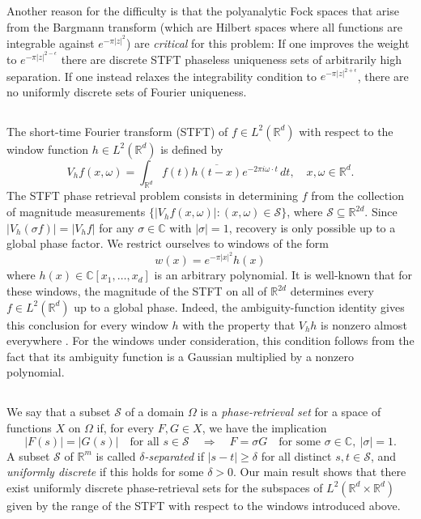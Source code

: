 \documentclass[11pt]{amsart}
\newcommand{\C}{\mathbb C}
\newcommand{\R}{\mathbb R}
\begin{document}
Another reason for the difficulty is that the polyanalytic Fock spaces that arise from the Bargmann transform (which are Hilbert spaces where all functions are integrable against $e^{-\pi|z|^2}$) are \emph{critical} for this problem: If one improves the weight to $e^{-\pi|z|^{2-\epsilon}}$ there are discrete STFT phaseless uniqueness sets of arbitrarily high separation. If one instead relaxes the integrability condition to $e^{-\pi|z|^{2+\epsilon}}$, there are no uniformly discrete sets of Fourier uniqueness.


\subsection{}

The short-time Fourier transform (STFT) of $f \in L^2(\R^d)$ with respect to the window function $h \in L^2(\R^d)$ is defined by
\begin{equation}\label{eq:intro_stft}
    V_h f(x,\omega) = \int_{\R^d} f(t)\overline{h(t-x)}e^{-2\pi i\omega\cdot t}\, dt,
    \quad x,\omega \in \R^d.
\end{equation}
The STFT phase retrieval problem consists in determining $f$ from the collection of magnitude measurements $\{ |V_h f(x,\omega)| : (x,\omega) \in \mathcal{S} \}$, where $\mathcal{S} \subseteq \R^{2d}$. Since $|V_h (\sigma f)|=|V_hf|$ for any $\sigma \in \mathbb C$ with $|\sigma|=1$, recovery is only possible up to a global phase factor. We restrict ourselves to windows of the form $$w(x)= e^{-\pi |x|^2} h(x)$$ where $h(x) \in \mathbb C[x_1,\ldots,x_d]$ is an arbitrary polynomial. 
It is well-known that for these windows, the magnitude of the STFT on all of $\R^{2d}$ determines every $f\in L^2(\R^d)$ up to a global phase. Indeed, the ambiguity-function identity gives this conclusion for every window $h$ with the property that $V_h h$ is nonzero almost everywhere \cite{AlaifariWellershoff2022}. For the windows under consideration, this condition follows from the fact that its ambiguity function is a Gaussian multiplied by a nonzero polynomial.

\subsection{} We say that a subset $\mathcal S$ of a domain $\Omega$ is a \emph{phase-retrieval set} for a space of functions $X$ on $\Omega$ if, for every $F,G\in X$, we have the implication
$$
    |F(s)|=|G(s)|\quad \text{for all }s\in\mathcal S
    \quad\Longrightarrow\quad
    F=\sigma G\quad \text{for some } \sigma\in\C,\ |\sigma|=1.
$$
A subset $\mathcal S$ of $\mathbb R^{m}$ is called \emph{$\delta$-separated} if $|s-t|\geq\delta$ for all distinct $s,t\in\mathcal S$, and \emph{uniformly discrete} if this holds for some $\delta>0$. Our main result shows that there exist uniformly discrete phase-retrieval sets for the subspaces of $L^2(\mathbb R^d \times \mathbb R^d)$ given by the range of the STFT with respect to the windows introduced above.
\end{document}
